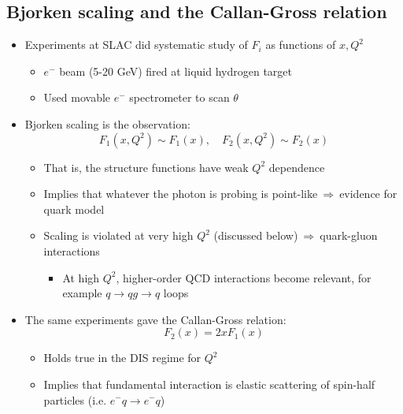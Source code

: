 \documentclass[11pt]{article}
\newcommand{\el}{\ensuremath{e^{-}}\xspace}
\newcommand{\thus}{\ensuremath{~\Rightarrow~}}
\begin{document}
\subsection{Bjorken scaling and the Callan-Gross relation}
\begin{itemize}
  \item Experiments at SLAC did systematic study of $F_i$ as functions of $x,Q^2$
  \begin{itemize}
    \item \el beam (5-20 GeV) fired at liquid hydrogen target
    \item Used movable \el spectrometer to scan $\theta$
  \end{itemize}
  \item Bjorken scaling is the observation:
  \begin{equation}
    F_1(x,Q^2) \sim F_1(x),\quad F_2(x,Q^2)\sim F_2(x)
  \end{equation}
  \begin{itemize}
    \item That is, the structure functions have weak $Q^2$ dependence
    \item Implies that whatever the photon is probing is point-like\thus evidence for quark model
    \item Scaling is violated at very high $Q^2$ (discussed below)\thus quark-gluon interactions
    \begin{itemize}
      \item At high $Q^2$, higher-order QCD interactions become relevant, for example $q\rightarrow qg \rightarrow q$ loops
    \end{itemize}
  \end{itemize}
  \item The same experiments gave the Callan-Gross relation:
  \begin{equation}
    F_2(x) = 2xF_1(x)
  \end{equation}
  \begin{itemize}
    \item Holds true in the DIS regime for $Q^2$
    \item Implies that fundamental interaction is elastic scattering of spin-half particles (i.e. $\el q\rightarrow \el q$)
  \end{itemize}
\end{itemize}
\end{document}

